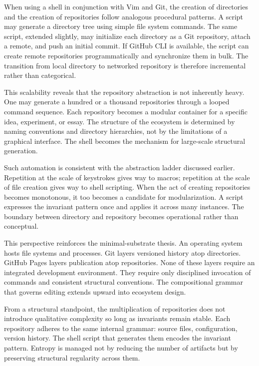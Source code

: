 \documentclass[12pt]{article}
\begin{document}
When using a shell in conjunction with Vim and Git, the creation of directories and the creation of repositories follow analogous procedural patterns. A script may generate a directory tree using simple file system commands. The same script, extended slightly, may initialize each directory as a Git repository, attach a remote, and push an initial commit. If GitHub CLI is available, the script can create remote repositories programmatically and synchronize them in bulk. The transition from local directory to networked repository is therefore incremental rather than categorical.

This scalability reveals that the repository abstraction is not inherently heavy. One may generate a hundred or a thousand repositories through a looped command sequence. Each repository becomes a modular container for a specific idea, experiment, or essay. The structure of the ecosystem is determined by naming conventions and directory hierarchies, not by the limitations of a graphical interface. The shell becomes the mechanism for large-scale structural generation.

Such automation is consistent with the abstraction ladder discussed earlier. Repetition at the scale of keystrokes gives way to macros; repetition at the scale of file creation gives way to shell scripting. When the act of creating repositories becomes monotonous, it too becomes a candidate for modularization. A script expresses the invariant pattern once and applies it across many instances. The boundary between directory and repository becomes operational rather than conceptual.

This perspective reinforces the minimal-substrate thesis. An operating system hosts file systems and processes. Git layers versioned history atop directories. GitHub Pages layers publication atop repositories. None of these layers require an integrated development environment. They require only disciplined invocation of commands and consistent structural conventions. The compositional grammar that governs editing extends upward into ecosystem design.

From a structural standpoint, the multiplication of repositories does not introduce qualitative complexity so long as invariants remain stable. Each repository adheres to the same internal grammar: source files, configuration, version history. The shell script that generates them encodes the invariant pattern. Entropy is managed not by reducing the number of artifacts but by preserving structural regularity across them.
\end{document}
